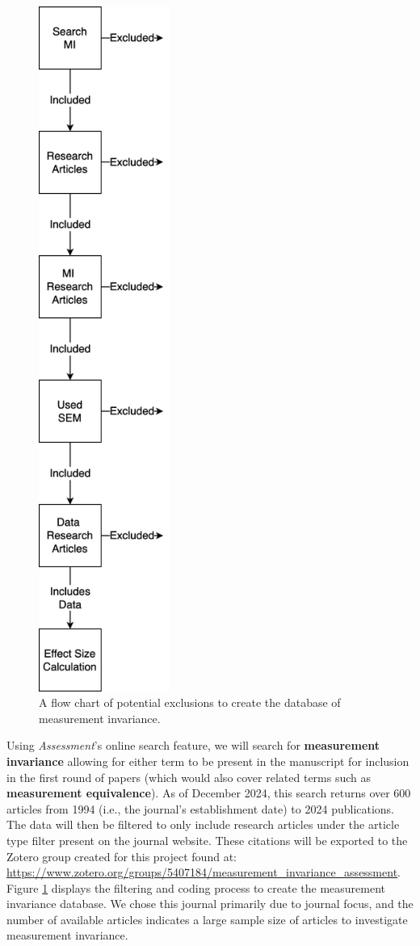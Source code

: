 \documentclass[
  man]{apa7}
\begin{document}
\begin{figure}
\includegraphics[width=1.69in]{../pics/data_curation} \caption{A flow chart of potential exclusions to create the database of measurement invariance.}\label{fig:figure-process}
\end{figure}

Using \emph{Assessment}'s online search feature, we will search for \textbf{measurement invariance} allowing for either term to be present in the manuscript for inclusion in the first round of papers (which would also cover related terms such as \textbf{measurement equivalence}). As of December 2024, this search returns over 600 articles from 1994 (i.e., the journal's establishment date) to 2024 publications. The data will then be filtered to only include research articles under the article type filter present on the journal website. These citations will be exported to the Zotero group created for this project found at: \url{https://www.zotero.org/groups/5407184/measurement_invariance_assessment}. Figure \ref{fig:figure-process} displays the filtering and coding process to create the measurement invariance database. We chose this journal primarily due to journal focus, and the number of available articles indicates a large sample size of articles to investigate measurement invariance.
\end{document}
